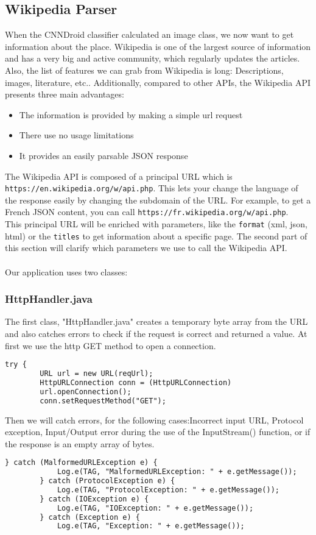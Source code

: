 \subsection {Wikipedia Parser}\label{wikipedia_parser}
When the CNNDroid classifier calculated an image class, we now want to get information about the place. Wikipedia is one of the largest source of information and has a very big and active community, which regularly updates the articles. Also, the list of features we can grab from Wikipedia is long: Descriptions, images, literature, etc..
Additionally, compared to other APIs, the Wikipedia API presents three main advantages:
\begin{itemize}
    \item{The information is provided by making a simple url request}
    \item{There use no usage limitations}
    \item{It provides an easily parsable JSON response}
\end{itemize}
The Wikipedia API is composed of a principal URL which is \texttt{https://en.wikipedia.org/w/api.php}. This lets your change the language of the response easily by changing the subdomain of the URL. For example, to get a French JSON content, you can call \texttt{https://fr.wikipedia.org/w/api.php}.\\
This principal URL will be enriched with parameters, like the \texttt{format} (xml, json, html) or the \texttt{titles} to get information about a specific page. The second part of this section will clarify which parameters we use to call the Wikipedia API.\\\\

Our application uses two classes:
\subsubsection{HttpHandler.java}
The first class, "HttpHandler.java" creates a temporary byte array from the URL and also catches errors to check if the request is correct and returned a value.
At first we use the http GET method to open a connection.
\begin{lstlisting}[language=XML, basicstyle=\scriptsize]
    try {
        URL url = new URL(reqUrl);
        HttpURLConnection conn = (HttpURLConnection)
        url.openConnection();
        conn.setRequestMethod("GET");
\end{lstlisting}

Then we will catch errors, for the following cases:Incorrect input URL, Protocol exception, Input/Output error during the use of the InputStream() function, or if the response is an empty array of bytes.
\begin{lstlisting}[language=XML, basicstyle=\scriptsize]
    } catch (MalformedURLException e) {
            Log.e(TAG, "MalformedURLException: " + e.getMessage());
        } catch (ProtocolException e) {
            Log.e(TAG, "ProtocolException: " + e.getMessage());
        } catch (IOException e) {
            Log.e(TAG, "IOException: " + e.getMessage());
        } catch (Exception e) {
            Log.e(TAG, "Exception: " + e.getMessage());
\end{lstlisting}

